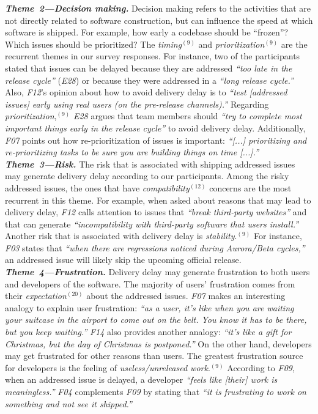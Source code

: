 \begin{sloppypar}
\noindent\textit{\textbf{Theme~2---Decision making.}} Decision making refers to the
activities that are not directly related to software construction, but can
influence the speed at which software is shipped. For example, how early a
codebase should be ``frozen''? Which issues should be prioritized? The {\em
timing}$^{(9)}$ and {\em prioritization}$^{(9)}$ are the recurrent themes in
our survey responses. For instance, two of the participants stated that issues
can be delayed because they are addressed {\em ``too late in the release
cycle''} ({\em E28}) or because they were addressed in a {\em ``long release
cycle.''} Also, {\em F12}'s opinion about how to avoid delivery delay is to
{\em ``test [addressed issues] early using real users (\eg on the pre-release
channels).''} Regarding {\em prioritization},$^{(9)}$ {\em E28} argues that team
members should {\em ``try to complete most important things early in the release
cycle''} to avoid delivery delay. Additionally, {\em F07} points out how
re-prioritization of issues is important: {\em ``[...] prioritizing and
re-prioritizing tasks to be sure you are building things on time [...].''}\\

\noindent\textit{\textbf{Theme~3---Risk.}} The risk that is associated with shipping
addressed issues may generate delivery delay according to our participants.
Among the risky addressed issues, the ones that have {\em
compatibility}$^{(12)}$ concerns are the most recurrent in this theme. For example, when
asked about reasons that may lead to delivery delay, {\em F12} calls
attention to issues that {\em ``break third-party websites''} and that can
generate {\em ``incompatibility with third-party software that users install.''}
Another risk that is associated with delivery delay is {\em stability}.$^{(9)}$
For instance, {\em F03} states that {\em ``when there are regressions
noticed during Aurora/Beta cycles,''} an addressed issue will likely skip the
upcoming official release.\\

\noindent\textit{\textbf{Theme~4---Frustration.}} Delivery delay may generate
frustration to both users and developers of the software. The majority of users'
frustration comes from their {\em expectation}$^{(20)}$ about the addressed
issues. {\em F07} makes an interesting analogy to explain user frustration: {\em
``as a user, it's like when you are waiting your suitcase in the airport to
come out on the belt. You know it has to be there, but you keep waiting.''}
{\em F14} also provides another analogy: {\em ``it's like a gift for Christmas,
but the day of Christmas is postponed.''} On the other hand, developers may get
frustrated for other reasons than users. The greatest frustration source for
developers is the feeling of {\em useless/unreleased work}.$^{(9)}$ According to
{\em F09}, when an addressed issue is delayed, a developer {\em ``feels like
[their] work is meaningless.''} {\em F04} complements {\em F09} by stating that
{\em ``it is frustrating to work on something and not see it shipped.''} \\


\end{sloppypar}
